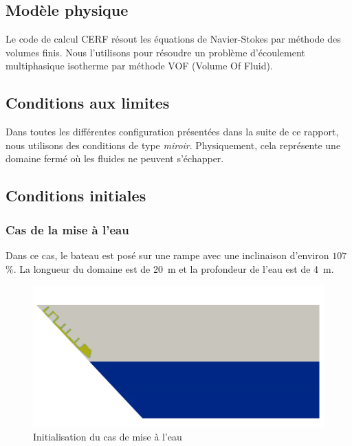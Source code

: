 \documentclass[../main.tex]{subfiles}
\begin{document}
\subsection{Modèle physique}

Le code de calcul CERF résout les équations de Navier-Stokes par méthode des volumes finis.
Nous l'utilisons pour résoudre un problème d'écoulement multiphasique isotherme par méthode VOF (Volume Of Fluid).



\subsection{Conditions aux limites}

Dans toutes les différentes configuration présentées dans la suite de ce rapport, nous utilisons des conditions de type \textit{miroir}.
Physiquement, cela représente une domaine fermé où les fluides ne peuvent s'échapper.





\subsection{Conditions initiales}


\subsubsection{Cas de la mise à l'eau}

Dans ce cas, le bateau est posé sur une rampe avec une inclinaison d'environ $107$ \%. La longueur du domaine est de \qty{20}{m} et la profondeur de l'eau est de \qty{4}{m}.

\begin{figure}[H]
    \centering
    \includegraphics[width=12cm]{IMAGES/part1/Init_zephyr_launching.png}
    \caption{Initialisation du cas de mise à l'eau}
\end{figure}
\end{document}
